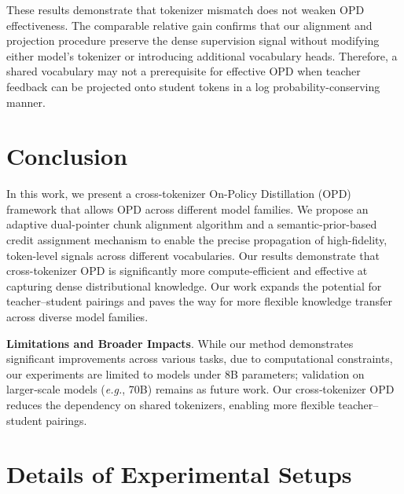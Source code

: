 \documentclass{article}
\theoremstyle{plain}
\theoremstyle{definition}
\theoremstyle{remark}
\begin{document}
These results demonstrate that tokenizer mismatch does not weaken OPD effectiveness. The comparable relative gain confirms that our alignment and projection procedure preserve the dense supervision signal without modifying either model's tokenizer or introducing additional vocabulary heads. Therefore, a shared vocabulary may not a prerequisite for effective OPD when teacher feedback can be projected onto student tokens in a log probability-conserving manner.


     

\section{Conclusion}


In this work, we present a cross-tokenizer On-Policy Distillation (OPD) framework that  allows OPD across different model families. We propose an adaptive dual-pointer chunk alignment algorithm and a semantic-prior-based credit assignment mechanism to enable the precise propagation of high-fidelity, token-level signals across different vocabularies. Our results demonstrate that cross-tokenizer OPD is significantly more compute-efficient and effective at capturing dense distributional knowledge. Our work expands the potential for teacher–student pairings and paves the way for more flexible knowledge transfer across diverse model families.

\textbf{Limitations and Broader Impacts}. While our method demonstrates significant improvements across various tasks, due to computational constraints, our experiments are limited to models under 8B parameters; validation on larger‑scale models (\emph{e.g.}, 70B) remains as future work. Our cross‑tokenizer OPD reduces the dependency on shared tokenizers, enabling more flexible teacher–student pairings.





        
        
        
        
        
        \newpage
        \appendix
        \onecolumn
\section{Details of Experimental Setups}\label{appendix:details}
        
\end{document}
